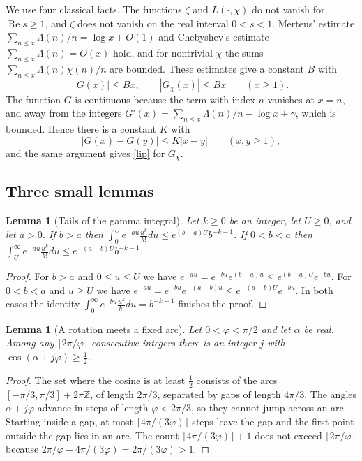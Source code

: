 \documentclass[11pt,letterpaper]{article}
\newtheorem{lemma}[theorem]{Lemma}
\numberwithin{equation}{section}
\begin{document}
We use four classical facts. The functions $\zeta$ and $L(\cdot,\chi)$ do not vanish for $\operatorname{Re}s\ge1$, and $\zeta$ does not vanish on the real interval $0<s<1$. Mertens' estimate $\sum_{n\le x}\Lambda(n)/n=\log x+O(1)$ and Chebyshev's estimate $\sum_{n\le x}\Lambda(n)=O(x)$ hold, and for nontrivial $\chi$ the sums $\sum_{n\le x}\Lambda(n)\chi(n)/n$ are bounded. These estimates give a constant $B$ with
\begin{equation}\label{triv}
|G(x)|\le Bx,\qquad |G_\chi(x)|\le Bx\qquad(x\ge1).
\end{equation}
The function $G$ is continuous because the term with index $n$ vanishes at $x=n$, and away from the integers $G'(x)=\sum_{n\le x}\Lambda(n)/n-\log x+\gamma$, which is bounded. Hence there is a constant $K$ with
\begin{equation}\label{lip}
|G(x)-G(y)|\le K|x-y|\qquad(x,y\ge1),
\end{equation}
and the same argument gives \eqref{lip} for $G_\chi$.

\subsection{Three small lemmas}

\begin{lemma}[Tails of the gamma integral]\label{tails}
Let $k\ge0$ be an integer, let $U\ge0$, and let $a>0$. If $b>a$ then $\int_0^Ue^{-au}\frac{u^k}{k!}du\le e^{(b-a)U}b^{-k-1}$. If $0<b<a$ then $\int_U^\infty e^{-au}\frac{u^k}{k!}du\le e^{-(a-b)U}b^{-k-1}$.
\end{lemma}
\begin{proof}
For $b>a$ and $0\le u\le U$ we have $e^{-au}=e^{-bu}e^{(b-a)u}\le e^{(b-a)U}e^{-bu}$. For $0<b<a$ and $u\ge U$ we have $e^{-au}=e^{-bu}e^{-(a-b)u}\le e^{-(a-b)U}e^{-bu}$. In both cases the identity $\int_0^\infty e^{-bu}\frac{u^k}{k!}du=b^{-k-1}$ finishes the proof.
\end{proof}

\begin{lemma}[A rotation meets a fixed arc]\label{rot}
Let $0<\varphi<\pi/2$ and let $\alpha$ be real. Among any $\lceil2\pi/\varphi\rceil$ consecutive integers there is an integer $j$ with $\cos(\alpha+j\varphi)\ge\tfrac12$.
\end{lemma}
\begin{proof}
The set where the cosine is at least $\tfrac12$ consists of the arcs $[-\pi/3,\pi/3]+2\pi\mathbb Z$, of length $2\pi/3$, separated by gaps of length $4\pi/3$. The angles $\alpha+j\varphi$ advance in steps of length $\varphi<2\pi/3$, so they cannot jump across an arc. Starting inside a gap, at most $\lceil4\pi/(3\varphi)\rceil$ steps leave the gap and the first point outside the gap lies in an arc. The count $\lceil4\pi/(3\varphi)\rceil+1$ does not exceed $\lceil2\pi/\varphi\rceil$ because $2\pi/\varphi-4\pi/(3\varphi)=2\pi/(3\varphi)>1$.
\end{proof}
\end{document}
